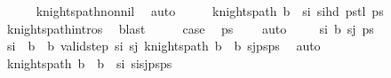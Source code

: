 \begin{isabellebody}
\ \ \ \ \isamarkupfalse%
\ knights{\isacharunderscore}{\kern0pt}path{\isacharunderscore}{\kern0pt}non{\isacharunderscore}{\kern0pt}nil\ \isamarkupfalse%
\ auto\isanewline
\ \ \isamarkupfalse%
\ \isamarkupfalse%
\ {\isachardoublequoteopen}knights{\isacharunderscore}{\kern0pt}path\ {\isacharparenleft}{\kern0pt}b\ {\isasymunion}\ {\isacharbraceleft}{\kern0pt}s\isactrlsub i{\isacharbraceright}{\kern0pt}{\isacharparenright}{\kern0pt}\ {\isacharparenleft}{\kern0pt}s\isactrlsub i{\isacharhash}{\kern0pt}hd\ pstl\ ps\isanewline
\ \ \ \ \isamarkupfalse%
\ knights{\isacharunderscore}{\kern0pt}path{\isachardot}{\kern0pt}intros\ \isamarkupfalse%
\ blast\isanewline
\ \ \isamarkupfalse%
\ \isamarkupfalse%
\ {\isacharquery}{\kern0pt}case\ \isamarkupfalse%
\ {\isacartoucheopen}ps\ {\isasymnoteq}\ {\isacharbrackleft}{\kern0pt}{\isacharbrackright}{\kern0pt}{\isacartoucheclose}\ \isamarkupfalse%
\ auto\isanewline
{}\isamarkupfalse%
\isanewline
\ \ \isamarkupfalse%
\ {\isacharparenleft}{\kern0pt}{}\ s\isactrlsub i\ b\ s\isactrlsub j\ ps\isanewline
\ \ \isamarkupfalse%
\ \isamarkupfalse%
\ {\isachardoublequoteopen}s\isactrlsub i\ {\isasymnotin}\ b\ {\isasymunion}\ b\ {\isachardoublequoteopen}valid{\isacharunderscore}{\kern0pt}step\ s\isactrlsub i\ s\isactrlsub j{\isachardoublequoteclose}\ {\isachardoublequoteopen}knights{\isacharunderscore}{\kern0pt}path\ {\isacharparenleft}{\kern0pt}b\ {\isasymunion}\ b\ {\isacharparenleft}{\kern0pt}s\isactrlsub j{\isacharhash}{\kern0pt}psps\ \isamarkupfalse%
\ auto\isanewline
\ \ \isamarkupfalse%
\ \isamarkupfalse%
\ {\isachardoublequoteopen}knights{\isacharunderscore}{\kern0pt}path\ {\isacharparenleft}{\kern0pt}b\ {\isasymunion}\ b\ {\isasymunion}\ {\isacharbraceleft}{\kern0pt}s\isactrlsub i{\isacharbraceright}{\kern0pt}{\isacharparenright}{\kern0pt}\ {\isacharparenleft}{\kern0pt}s\isactrlsub i{\isacharhash}{\kern0pt}s\isactrlsub j{\isacharhash}{\kern0pt}psps\isanewline

\end{isabellebody}

